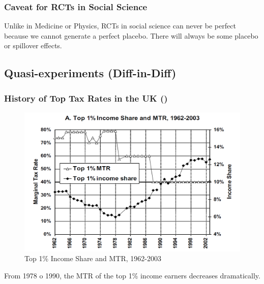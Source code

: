             \subsubsection{Caveat for RCTs in Social Science}

                Unlike in Medicine or Physics, RCTs in social science can never be perfect because we cannot generate a perfect placebo. There will always be some placebo or spillover effects.
                
        \subsection{Quasi-experiments (Diff-in-Diff)}

            \subsubsection{History of Top Tax Rates in the UK (\cite{brewer_means-testing_2010})}

                \begin{figure}[H]
                    \centering
                    \includegraphics[width=4.5in]{images/ch13/13_DID_1.png}
                    \caption{Top 1\% Income Share and MTR, 1962-2003}
                \end{figure}

                From 1978 o 1990, the MTR of the top 1\% income earners decreases dramatically.
                    
